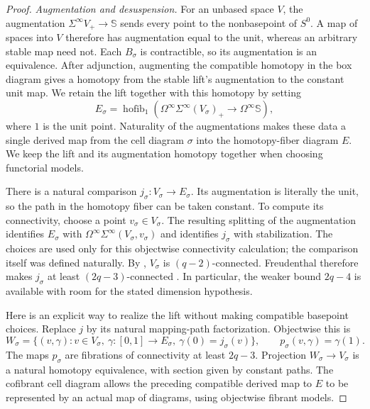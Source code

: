 \begin{proof}
\emph{Augmentation and desuspension.}
For an unbased space $V$, the augmentation
$\Sigma^\infty V_+\to\mathbb S$ sends every point to the nonbasepoint
of $S^0$.  A map of spaces into $V$ therefore has augmentation equal
to the unit, whereas an arbitrary stable map need not.
Each $B_\sigma$ is contractible, so its augmentation is an equivalence.
After adjunction, augmenting the compatible homotopy in the box
diagram gives a homotopy from the stable lift's augmentation to the
constant unit map.
We retain the lift together with this homotopy by setting
\begin{equation}\label{eq:augmentation-fiber}
 E_\sigma=\operatorname{hofib}_{1}\left(
 \Omega^\infty\Sigma^\infty(V_\sigma)_+
 \longrightarrow\Omega^\infty\mathbb S\right),
\end{equation}
where $1$ is the unit point.  Naturality of the augmentations makes
these data a single derived map from the cell diagram $\sigma$
into the homotopy-fiber diagram $E$.  We keep the lift and its
augmentation homotopy together when choosing functorial models.

There is a natural comparison $j_\sigma:V_\sigma\to E_\sigma$.
Its augmentation is literally the unit, so the path in the homotopy
fiber can be taken constant.  To compute its connectivity, choose a
point $v_\sigma\in V_\sigma$.  The resulting splitting of the
augmentation identifies $E_\sigma$ with
$\Omega^\infty\Sigma^\infty(V_\sigma,v_\sigma)$ and identifies
$j_\sigma$ with stabilization.  The choices are used only for this
objectwise connectivity calculation; the comparison itself was
defined naturally.  By ,
$V_\sigma$ is $(q-2)$-connected.  Freudenthal therefore makes
$j_\sigma$ at least $(2q-3)$-connected
\cite[Corollary~4.24]{Hatcher2002}.  In particular, the weaker bound
$2q-4$ is available with room for the stated dimension hypothesis.

Here is an explicit way to realize the lift without making compatible
basepoint choices.  Replace $j$ by its natural mapping-path
factorization.  Objectwise this is
\[
 W_\sigma=\{(v,\gamma):v\in V_\sigma,\ 
 \gamma:[0,1]\to E_\sigma,\ \gamma(0)=j_\sigma(v)\},
 \qquad p_\sigma(v,\gamma)=\gamma(1).
\]
The maps $p_\sigma$ are fibrations of connectivity at least $2q-3$.
Projection $W_\sigma\to V_\sigma$ is a natural homotopy equivalence,
with section given by constant paths.  The cofibrant cell diagram
allows the preceding compatible derived map to $E$ to be represented
by an actual map of diagrams, using objectwise fibrant models.


\end{proof}

